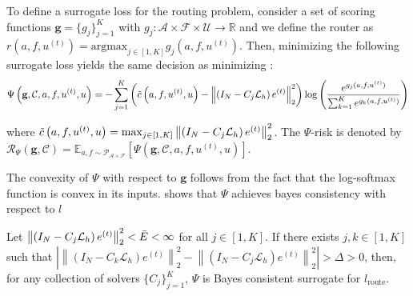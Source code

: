 \documentclass[12pt]{article}
\begin{document}
To define a surrogate loss for the routing problem, consider a set of scoring functions $\mathbf{g} =\{g_j\}_{j = 1}^K$ with $g_j: \mathcal{A} \times \mathcal{F} \times \mathcal{U} \to \mathbb{R}$ and we define the router as $r(a, f, u^{(t)}) = \text{argmax}_{j \in [1, K]} g_j(a, f, u^{(t)})$. Then, minimizing the following surrogate loss yields the same decision as minimizing :
\begin{equation} \label{eq:routersurrogate}
    \Psi\left(\mathbf{g}, \mathcal{C}, a, f, u^{(t)}, u\right) = -\sum_{j = 1}^K \left(\Tilde{c}\left(a, f, u^{(t)}, u\right) -\left\|\left( I_N - C_{j} \mathcal{L}_{h}\right)e^{(t)}\right\|^2_2\right) \log\left(\frac{e^{g_j(a, f, u^{(t)})}}{\sum_{k = 1}^Ke^{g_k(a, f, u^{(t)})}}\right)%
\end{equation}

where 
$\Tilde{c}\left(a,f, u^{(t)}, u\right) = \max_{j \in [1, K]} \left\|\left( I_N - C_{j} \mathcal{L}_{h}\right)e^{(t)}\right\|^2_2$. The $\Psi$-risk is denoted by $\mathcal{R}_{\Psi}\left(\mathbf{g}, \mathcal{C}\right) = \mathbb{E}_{a, f \sim \mathcal{P}_{\mathcal{A} \times \mathcal{F}}}\left[\Psi\left(\mathbf{g}, \mathcal{C}, a, f, u^{(t)}, u\right)\right]$. 

The convexity of $\Psi$ with respect to $\mathbf{g}$ follows from the fact that the log-softmax function is convex in its inputs.  shows that $\Psi$ achieves bayes consistency with respect to $l$

\begin{theorem} \label{th:consistency}
    Let $\left\|\left( I_N - C_{j} \mathcal{L}_{h}\right)e^{(t)}\right\|^2_2 < \Bar{E} < \infty$  for all $j \in [1, K]$. If there exists $j, k \in [1, K]$ such that $\left|\left\|\left( I_N - C_{k} \mathcal{L}_{h}\right)e^{(t)}\right\|^2_2 - \left\|\left( I_N - C_{j} \mathcal{L}_{h}\right)e^{(t)}\right\|^2_2\right| > \Delta > 0$, then, for any collection of solvers $\{C_j\}_{j= 1}^K$, $\Psi$ is Bayes consistent surrogate for $l_{\text{route}}$.
\end{theorem}


\end{document}
